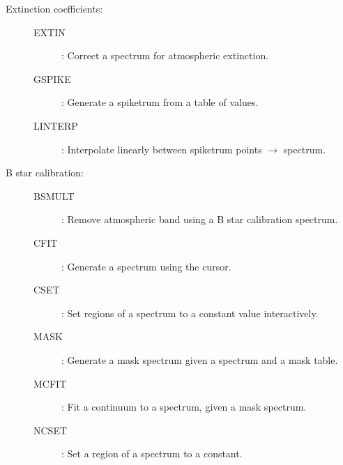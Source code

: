 \begin {description}
\begin{description}
\item [Extinction coefficients:]
\begin{description}
\item [EXTIN]: Correct a spectrum for atmospheric extinction.
\item [GSPIKE]: Generate a spiketrum from a table of values.
\item [LINTERP]: Interpolate linearly between spiketrum points $\rightarrow$ spectrum.
\end{description}

\item [B star calibration:]
\begin{description}
\item [BSMULT]: Remove atmospheric band using a B star calibration spectrum.
\item [CFIT]: Generate a spectrum using the cursor.
\item [CSET]: Set regions of a spectrum to a constant value interactively.
\item [MASK]: Generate a mask spectrum given a spectrum and a mask table.
\item [MCFIT]: Fit a continuum to a spectrum, given a mask spectrum.
\item [NCSET]: Set a region of a spectrum to a constant.
\end{description}
\end{description}

\item [MANIPULATION ---]


\end{description}
